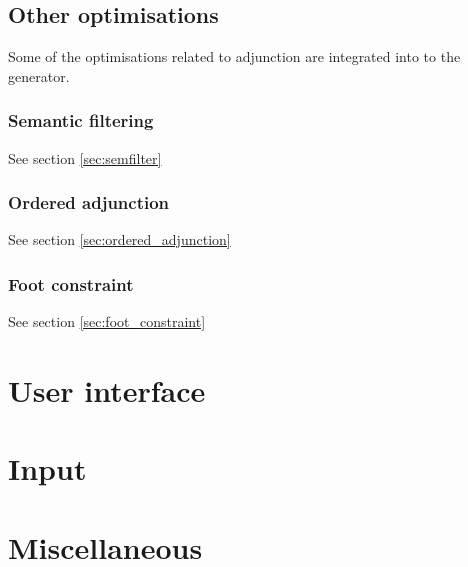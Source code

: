 \documentclass[a4paper,11pt]{report}
\begin{document}
       
       
% 

\chapter{Other optimisations}
\label{chp:other_optimisations}

Some of the optimisations related to adjunction are integrated into
to the generator.

\section{Semantic filtering}

See section \ref{sec:semfilter}

\section{Ordered adjunction}

See section \ref{sec:ordered_adjunction}

\section{Foot constraint}

See section \ref{sec:foot_constraint}

\part{User interface}




       
       


\part{Input}



%
%

\part{Miscellaneous}




{


}
\end{document}
